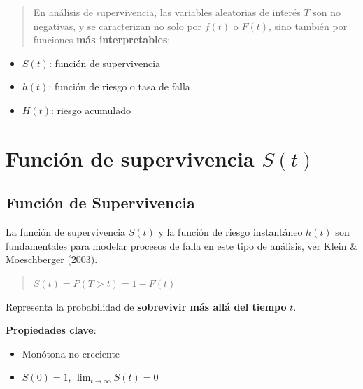 \documentclass[
  letterpaper,
  DIV=11,
  numbers=noendperiod]{scrartcl}
\providecommand{\tightlist}{%
  \setlength{\itemsep}{0pt}\setlength{\parskip}{0pt}}
\begin{document}
\begin{quote}
En análisis de supervivencia, las variables aleatorias de interés \(T\)
son no negativas, y se caracterizan no solo por \(f(t)\) o \(F(t)\),
sino también por funciones \textbf{más interpretables}:
\end{quote}

\begin{itemize}
\tightlist
\item
  \(S(t)\): función de supervivencia
\item
  \(h(t)\): función de riesgo o tasa de falla
\item
  \(H(t)\): riesgo acumulado
\end{itemize}

\section{\texorpdfstring{Función de supervivencia
\(S(t)\)}{Función de supervivencia S(t)}}\label{funciuxf3n-de-supervivencia-st}

\subsection{Función de Supervivencia}\label{funciuxf3n-de-supervivencia}

La función de supervivencia \(S(t)\) y la función de riesgo instantáneo
\(h(t)\) son fundamentales para modelar procesos de falla en este tipo
de análisis, ver Klein \& Moeschberger (2003).

\begin{quote}
\(S(t) = P(T > t) = 1 - F(t)\)
\end{quote}

Representa la probabilidad de \textbf{sobrevivir más allá del tiempo}
\(t\).

\textbf{Propiedades clave}:

\begin{itemize}
\tightlist
\item
  Monótona no creciente\\
\item
  \(S(0) = 1\), \(\lim_{t \to \infty} S(t) = 0\)
\end{itemize}
\end{document}
